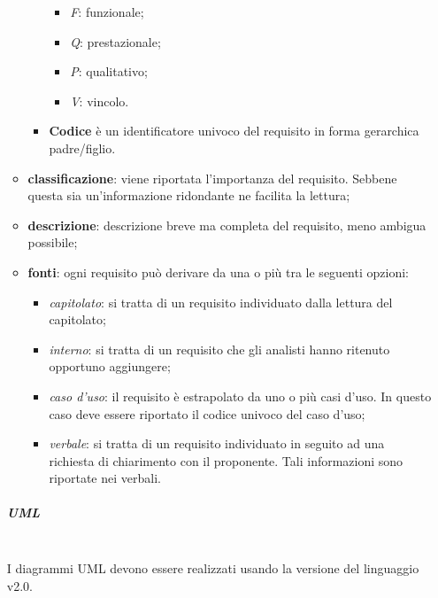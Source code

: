 \begin{itemize}
\begin{itemize}
\begin{itemize}
		\begin{itemize}
			\item \textit{F}: funzionale;
			\item \textit{Q}: prestazionale;
			\item \textit{P}: qualitativo;
			\item \textit{V}: vincolo.
		\end{itemize}
		\item \textbf{Codice} è un identificatore univoco del requisito in forma gerarchica padre/figlio.
	\end{itemize}
	\item \textbf{classificazione}: viene riportata l'importanza del requisito. Sebbene questa sia un'informazione ridondante ne facilita la lettura;
	\item \textbf{descrizione}: descrizione breve ma completa del requisito, meno ambigua possibile;
	\item \textbf{fonti}: ogni requisito può derivare da una o più tra le seguenti opzioni:
	\begin{itemize}
		\item \textit{capitolato}: si tratta di un requisito individuato dalla lettura del capitolato;
		\item \textit{interno}: si tratta di un requisito che gli analisti hanno ritenuto opportuno aggiungere;
		\item \textit{caso d'uso}: il requisito è estrapolato da uno o più casi d'uso. In questo caso deve essere riportato il codice univoco del caso d'uso;
		\item \textit{verbale}: si tratta di un requisito individuato in seguito ad una richiesta di chiarimento con il proponente. Tali informazioni sono riportate nei verbali.
	\end{itemize}
\end{itemize}

\subparagraph{UML} \mbox{}\\
I diagrammi UML devono essere realizzati usando la versione del linguaggio v2.0.


\end{itemize}
